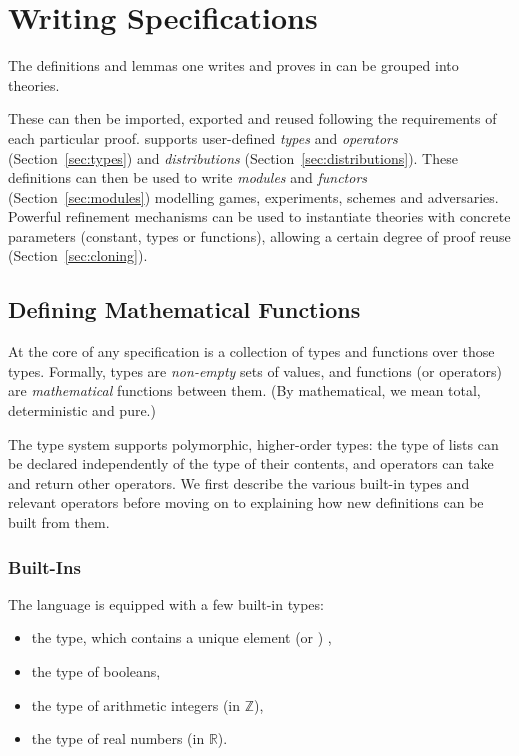 
\chapter{Writing Specifications\label{chap:theories}}
The definitions and lemmas one writes and proves in \EasyCrypt can be grouped
into theories.

These can then be imported, exported and reused following the
requirements of each particular proof. \EasyCrypt supports user-defined
\emph{types} and \emph{operators} (Section~\ref{sec:types}) and
\emph{distributions} (Section~\ref{sec:distributions}). These definitions can
then be used to write \emph{modules} and \emph{functors}
(Section~\ref{sec:modules}) modelling games, experiments, schemes and
adversaries. Powerful refinement mechanisms can be used to instantiate theories
with concrete parameters (constant, types or functions), allowing a certain
degree of proof reuse (Section~\ref{sec:cloning}).


\section{Defining Mathematical Functions\label{sec:types}}
At the core of any \EasyCrypt specification is a collection of types and functions
over those types. Formally, \EasyCrypt types are \emph{non-empty} sets of
values, and functions (or operators) are \emph{mathematical} functions between
them. (By mathematical, we mean total, deterministic and pure.)

The \EasyCrypt type system supports polymorphic, higher-order types: the type of
lists can be declared independently of the type of their contents, and operators
can take and return other operators. We first describe the various built-in
types and relevant operators before moving on to explaining how new definitions
can be built from them.


\subsection{Built-Ins}
The language is equipped with a few built-in types:
\begin{itemize}\itemsep-.5em
\item the  type, which
        contains a unique element
         (or \rawec{()}) ,
\item the  type of booleans,
\item the  type of arithmetic integers (in $\mathbb{Z}$),
\item the  type of real numbers (in $\mathbb{R}$).
\end{itemize}

